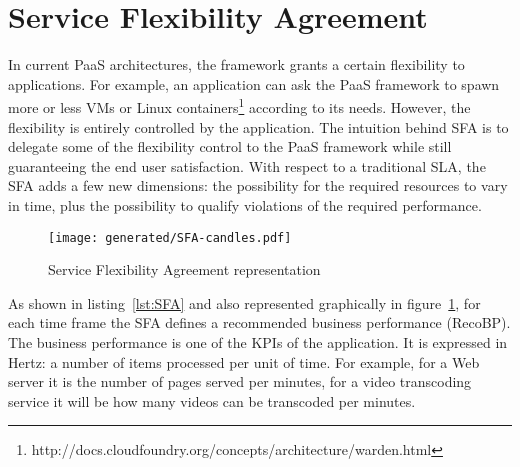 \section{Service Flexibility Agreement}
\label{sec:sfa}

In current PaaS architectures, the framework grants a certain flexibility to applications.
For example, an application can ask the PaaS framework to spawn more or less VMs or Linux containers\footnote{http://docs.cloudfoundry.org/concepts/architecture/warden.html} according to its needs.
However, the flexibility is entirely controlled by the application.
The intuition behind SFA is to delegate some of the flexibility control to the PaaS framework while still guaranteeing the end user satisfaction.
With respect to a traditional SLA, the SFA adds a few new dimensions: the possibility for the required resources to vary in time, plus the possibility to qualify violations of the required performance.

\begin{figure}[h]
\centering
\texttt{[image: generated/SFA-candles.pdf]}
\caption{Service Flexibility Agreement representation}
\label{fig:SFA}
\end{figure}


As shown in listing~\ref{lst:SFA} and also represented graphically in figure~\ref{fig:SFA}, for each time frame the SFA defines a recommended business performance (RecoBP). 
The business performance is one of the KPIs of the application.
It is expressed in Hertz: a number of items processed per unit of time.
For example, for a Web server it is the number of pages served per minutes, for a video transcoding service it will be how many videos can be transcoded per minutes.

